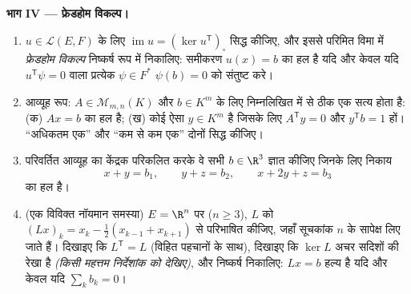 \begin{problem}[{सप्ताहांत समस्या --- परिमित विमा में द्वैतता
और फ्रेडहोम विकल्प}]
\medskip
\noindent\textbf{भाग IV --- फ्रेडहोम विकल्प।}
\begin{enumerate}[resume]
  \item $u \in \mathcal{L}(E, F)$ के लिए $\operatorname{im} u = (\ker u^{\mathsf
        T})_\circ$ सिद्ध कीजिए, और इससे परिमित विमा में
        \emph{फ्रेडहोम विकल्प} निष्कर्ष रूप में निकालिए: समीकरण $u(x) = b$
        का हल है यदि और केवल यदि $u^{\mathsf T}\psi = 0$ वाला प्रत्येक $\psi \in F^*$ $\psi(b) = 0$ को
        संतुष्ट करे।
  \item आव्यूह रूप: $A \in \mathcal{M}_{m,n}(K)$ और $b \in
        K^m$ के लिए निम्नलिखित में से ठीक एक सत्य
        होता है: (क) $Ax = b$ का हल है; (ख) कोई ऐसा $y \in K^m$ है जिसके लिए $A^{\mathsf T}y = 0$
        और $y^{\mathsf T}b = 1$ हों। ``अधिकतम एक'' और ``कम से कम एक'' दोनों सिद्ध
        कीजिए।
  \item परिवर्तित आव्यूह का केंद्रक परिकलित करके वे सभी $b \in \R^3$ ज्ञात
        कीजिए जिनके लिए निकाय
        \[
        x + y = b_1, \qquad y + z = b_2, \qquad x + 2y + z = b_3
        \]
        का हल है।
  \item (एक विविक्त नॉयमान समस्या) $E = \R^n$ पर ($n \geq 3$), $L$ को $(Lx)_k = x_k - \frac12(x_{k-1} +
        x_{k+1})$ से
        परिभाषित कीजिए, जहाँ सूचकांक $n$ के सापेक्ष लिए जाते हैं।
        दिखाइए कि $L^{\mathsf T} = L$ (विहित पहचानों के साथ), दिखाइए कि $\ker L$ अचर
        सदिशों की रेखा है \emph{(किसी महत्तम निर्देशांक को देखिए)},
        और निष्कर्ष निकालिए: $Lx = b$ हल्य है यदि और केवल यदि $\sum_k b_k = 0$।
\end{enumerate}


\end{problem}
